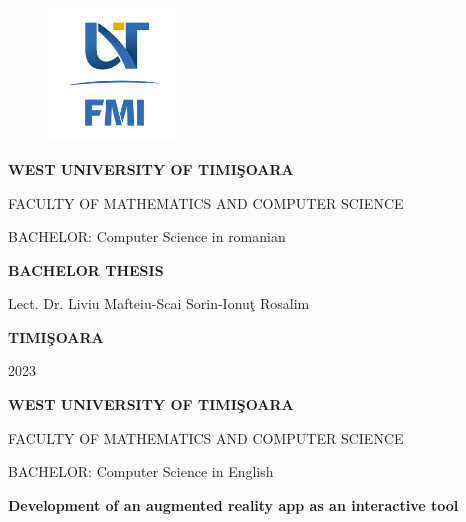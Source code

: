 \documentclass[12pt,a4paper]{book}
\theoremstyle{definition}
\theoremstyle{remark}
\begin{document}
\sloppy

\thispagestyle{empty}

\begin{center}
    \begin{figure}[h!]
        \vspace{-20pt}
        \begin{center}
            \includegraphics[width=100pt]{img/FMI-03.png}
        \end{center}
    \end{figure}


    {\large{\bf WEST UNIVERSITY OF TIMI\c SOARA

        FACULTY OF MATHEMATICS AND COMPUTER SCIENCE

        BACHELOR:  Computer Science in romanian}}

    \vspace{120pt}
    {\huge {\bf BACHELOR THESIS}}

    \vspace{160pt}
\end{center}

{\large{}

\noindent Lect. Dr. Liviu Mafteiu-Scai\hfill
\noindent Sorin-Ionu\c t Rosalim
}

\vfill
\begin{center}
    {\bf TIMI\c SOARA

        2023}
\end{center}
\newpage
\thispagestyle{empty}
\begin{center}
    {\large{\bf WEST UNIVERSITY OF TIMI\c SOARA

            FACULTY OF MATHEMATICS AND COMPUTER SCIENCE

            BACHELOR:  Computer Science in English}}

    \vspace{200pt}
    {\huge {\bf Development of an augmented reality app as an interactive tool}}

    \vspace{153pt}
\end{center}
\end{document}
